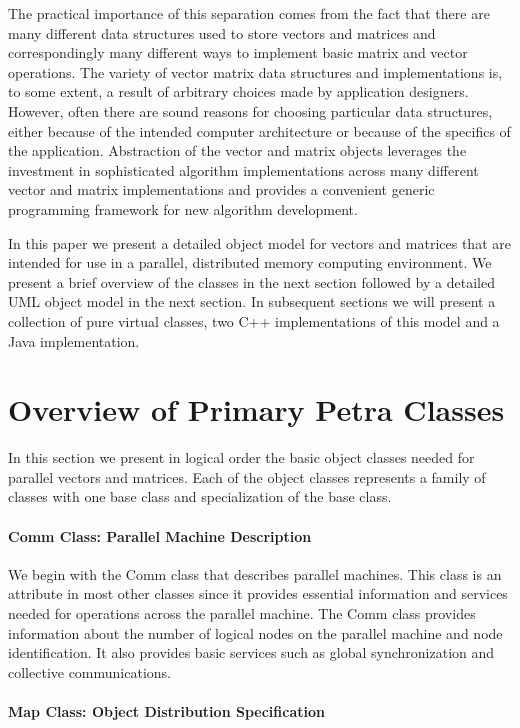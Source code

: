 \documentclass[12pt,relax]{PetraObjectModel}
\begin{document}
The practical importance of this separation comes from the fact 
that there are many different data structures used to store 
vectors and matrices and correspondingly many different ways 
to implement basic matrix and vector operations.  The variety 
of vector matrix data structures and implementations is, to 
some extent, a result of arbitrary choices made by application 
designers.  However, often there are sound reasons for choosing 
particular data structures, either because of the intended 
computer architecture or because of the specifics of the 
application.  Abstraction of the vector and matrix objects 
leverages the investment in sophisticated algorithm implementations 
across many different vector and matrix implementations and 
provides a convenient generic programming framework for new 
algorithm development.

In this paper we present a detailed object model for vectors 
and matrices that are intended for use in a parallel, distributed 
memory computing environment.  We present a brief overview of 
the classes in the next section followed by a detailed UML object 
model in the next section.  In subsequent sections we will present 
a collection of pure virtual classes, two C++ implementations of 
this model and a Java implementation.


\section{Overview of Primary Petra Classes}

In this section we present in logical order the basic object classes 
needed for parallel vectors and matrices.  Each of the object
classes represents a family of classes with one base class and 
specialization of the base class.

\paragraph{Comm Class:  Parallel Machine Description}

We begin with the Comm class that describes parallel machines.  
This class is an attribute in most other classes since it provides 
essential information and services needed for operations across the 
parallel machine.  The Comm class provides information about the number 
of  logical nodes on the parallel machine and node identification.  It 
also provides basic services such as global synchronization and collective 
communications.

\paragraph{Map Class: Object Distribution Specification}
\end{document}
